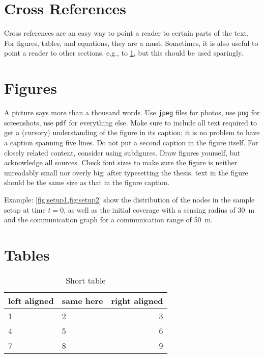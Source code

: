 \documentclass[]{nsm-thesis}
\begin{document}
\section{Cross References}
\label{sec:cross-ref}

Cross references are an easy way to point a reader to certain parts of the text.
For figures, tables, and equations, they are a must.
Sometimes, it is also useful to point a reader to other sections, e.g., to \cref{sec:cross-ref}, but this should be used sparingly.

\section{Figures}



A picture says more than a thousand words.
Use \texttt{jpeg} files for photos, use \texttt{png} for screenshots, use \texttt{pdf} for everything else.
Make sure to include all text required to get a (cursory) understanding of the figure in its caption; it is no problem to have a caption spanning five lines.
Do not put a second caption in the figure itself.
For closely related content, consider using subfigures.
Draw figures yourself, but acknowledge all sources.
Check font sizes to make sure the figure is neither unreadably small nor overly big: after typesetting the thesis, text in the figure should be the same size as that in the figure caption.

Example: \cref{fig:setup1,fig:setup2} show the distribution of the nodes in the sample setup at time $t=0$, as well as the initial coverage with a sensing radius of \SI{30}{\metre} and the communication graph for a communication range of \SI{50}{\metre}.

\clearpage
\section{Tables}

\begin{table}
    \centering
    \begin{tabular}{llr}
        \toprule
        left aligned & same here & right aligned \\
        \midrule
        1 & 2 & 3 \\
        4 & 5 & 6 \\
        7 & 8 & 9 \\
        \bottomrule
    \end{tabular}
    \caption{Short table}
    \label{tab:shorttable}
\end{table}
\end{document}
